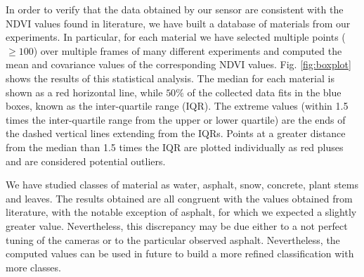 \documentclass[a4paper, 10pt, conference]{ieeeconf}      %
\newcommand{\paolo}[1]{{\textcolor{red}{#1}}}
\begin{document}
In order to verify that the data obtained by our sensor are consistent with the NDVI values found in literature, we have built a database of materials from our experiments.
In particular, for each material we have selected multiple points ($\geq 100$) over multiple frames of many different  experiments and computed the mean and covariance values of the corresponding NDVI values.
Fig. \ref{fig:boxplot} shows the results of this statistical analysis. 
The median for each material is shown as a red horizontal line, while $50\%$ of the collected data fits in the blue boxes, known as the inter-quartile range (IQR).
The extreme values (within 1.5 times the inter-quartile range from the upper or lower quartile) are the ends of the dashed vertical lines extending from the IQRs.
Points at a greater distance from the median than 1.5 times the IQR are plotted individually as red pluses and are considered potential outliers.

We have studied classes of material as water, asphalt, snow, concrete, plant stems and leaves. 
The results obtained are all congruent with the values obtained from literature, with the notable exception of asphalt, for which we expected a  slightly greater value.
Nevertheless, this discrepancy may be due  either to a not perfect tuning of the cameras or to the particular observed asphalt.
Nevertheless, the computed values can be used in future to build a more refined classification with more classes.
\end{document}
